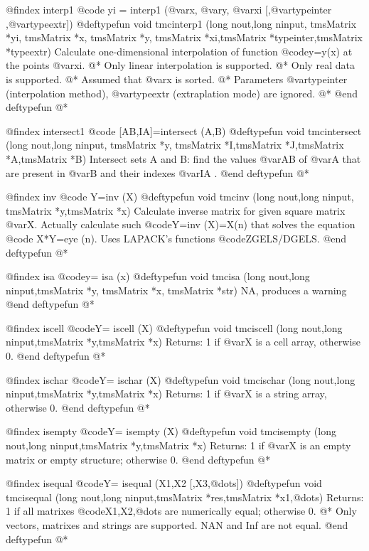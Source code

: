 @findex  interp1
@code{ yi = interp1 (@var{x}, @var{y}, @var{xi} [,@var{typeinter} ,@var{typeextr}]) }
@deftypefun void tmcinterp1 (long nout,long ninput, tmsMatrix *yi, tmsMatrix *x, tmsMatrix *y, tmsMatrix *xi,tmsMatrix *typeinter,tmsMatrix *typeextr)
Calculate one-dimensional interpolation of function @code{y=y(x)} at the points @var{xi}.  @*
Only linear interpolation is supported. @*
Only real data is supported. @*
Assumed that @var{x} is sorted. @*
Parameters @var{typeinter} (interpolation method), @var{typeextr} (extraplation mode) are ignored. @*
@end deftypefun
@*

@findex  intersect1
@code{ [AB,IA]=intersect (A,B)  }
@deftypefun void tmcintersect (long nout,long ninput, tmsMatrix *y, tmsMatrix *I,tmsMatrix *J,tmsMatrix *A,tmsMatrix *B)
Intersect sets A and B: find the values @var{AB} of @var{A} that are present in @var{B} and their indexes @var{IA} .
@end deftypefun
@*

@findex  inv
@code{ Y=inv (X)  }
@deftypefun void tmcinv (long nout,long ninput, tmsMatrix *y,tmsMatrix *x)
Calculate inverse matrix for given square matrix @var{X}. Actually calculate such @code{Y=inv (X)=X\eye (n)} 
that solves the equation @code{ X*Y=eye (n)}.
Uses LAPACK's functions @code{ZGELS/DGELS}.
@end deftypefun
@*


@findex  isa
@code{y= isa (x) }
@deftypefun void tmcisa (long nout,long ninput,tmsMatrix *y, tmsMatrix *x, tmsMatrix *str)
NA, produces a warning
@end deftypefun
@*


@findex  iscell
@code{Y= iscell (X) }
@deftypefun void tmciscell (long nout,long ninput,tmsMatrix *y,tmsMatrix *x)
Returns: 1 if @var{X} is a cell array, otherwise 0.
@end deftypefun
@*


@findex  ischar
@code{Y= ischar (X) }
@deftypefun void tmcischar (long nout,long ninput,tmsMatrix *y,tmsMatrix *x)
Returns: 1 if @var{X} is a string  array, otherwise 0.
@end deftypefun
@*

@findex  isempty
@code{Y= isempty (X) }
@deftypefun void tmcisempty (long nout,long ninput,tmsMatrix *y,tmsMatrix *x)
Returns: 1 if @var{X} is an empty matrix or empty structure; otherwise 0.
@end deftypefun
@*


@findex  isequal
@code{Y= isequal (X1,X2 [,X3,@dots{}]) }
@deftypefun void tmcisequal (long nout,long ninput,tmsMatrix *res,tmsMatrix *x1,@dots{})
Returns: 1 if all matrixes @code{X1,X2,@dots{}} are numerically equal; otherwise 0. @*
Only vectors, matrixes and strings are supported. NAN and Inf are not equal.
@end deftypefun
@*

